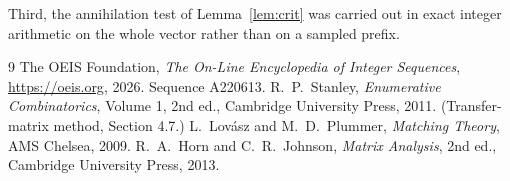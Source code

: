 \documentclass[11pt,a4paper]{article}
\theoremstyle{plain}
\theoremstyle{definition}
\begin{document}
Third, the annihilation test of Lemma~\ref{lem:crit} was carried out in exact integer
arithmetic on the whole vector rather than on a sampled prefix.

\begin{thebibliography}{9}
 The OEIS Foundation, \emph{The On-Line Encyclopedia of Integer
Sequences}, \url{https://oeis.org}, 2026. Sequence A220613.
 R.~P.~Stanley, \emph{Enumerative Combinatorics}, Volume 1, 2nd ed.,
Cambridge University Press, 2011. (Transfer-matrix method, Section 4.7.)
 L.~Lov\'asz and M.~D.~Plummer, \emph{Matching Theory}, AMS Chelsea,
2009.
 R.~A.~Horn and C.~R.~Johnson, \emph{Matrix Analysis}, 2nd ed., Cambridge
University Press, 2013.
\end{thebibliography}
\end{document}
